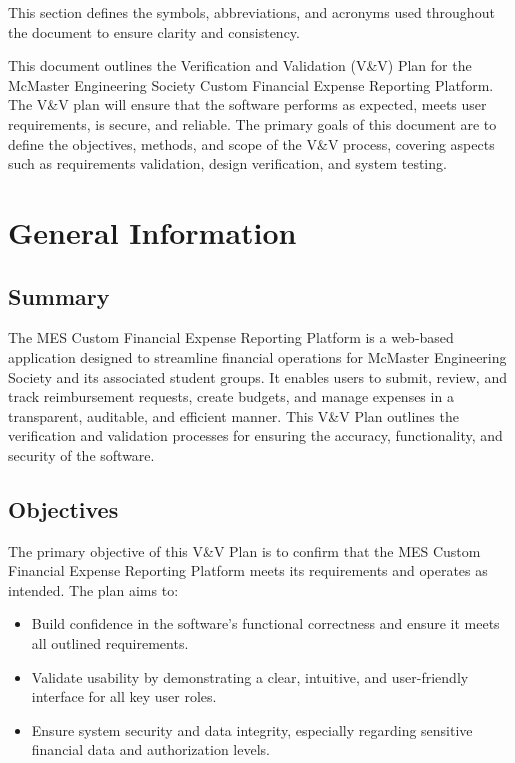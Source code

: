 \documentclass[12pt, titlepage]{article}
\begin{document}
\bigskip

This section defines the symbols, abbreviations, and acronyms used throughout the document to ensure clarity and consistency.


\newpage


This document outlines the Verification and Validation (V\&V) Plan for the McMaster Engineering Society Custom Financial Expense Reporting Platform. The V\&V plan will ensure that the software performs as expected, meets user requirements, is secure, and reliable. The primary goals of this document are to define the objectives, methods, and scope of the V\&V process, covering aspects such as requirements validation, design verification, and system testing.

\section{General Information} \label{sec:GeneralInfo}

\subsection{Summary}

The MES Custom Financial Expense Reporting Platform is a web-based application designed to streamline financial operations for McMaster Engineering Society and its associated student groups. It enables users to submit, review, and track reimbursement requests, create budgets, and manage expenses in a transparent, auditable, and efficient manner. This V\&V Plan outlines the verification and validation processes for ensuring the accuracy, functionality, and security of the software.

\subsection{Objectives}

The primary objective of this V\&V Plan is to confirm that the MES Custom Financial Expense Reporting Platform meets its requirements and operates as intended. The plan aims to:
\begin{itemize}
    \item Build confidence in the software's functional correctness and ensure it meets all outlined requirements.
    \item Validate usability by demonstrating a clear, intuitive, and user-friendly interface for all key user roles.
    \item Ensure system security and data integrity, especially regarding sensitive financial data and authorization levels.
\end{itemize}
\end{document}
